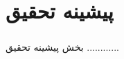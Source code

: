 
\chapter[پیشینه تحقیق]{\centering پیشینه تحقیق} \label{chapter:related-works}

\paragraph*{}
بخش پیشینه تحقیق ............